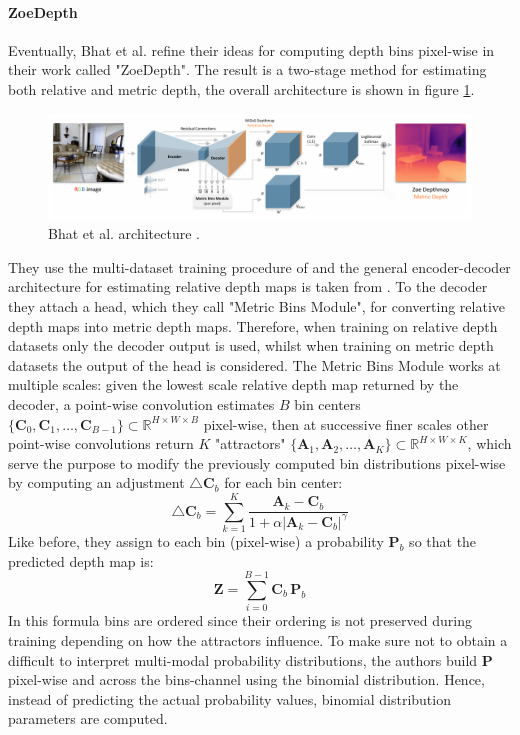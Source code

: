\paragraph{ZoeDepth} Eventually, Bhat et al. \cite{ZoeDepth} refine their ideas for computing depth bins pixel-wise in their work called "ZoeDepth".
The result is a two-stage method for estimating both relative and metric depth, the overall architecture is shown in figure \ref{fig:zoe_depth}.

\begin{figure}
	\centering
	\includegraphics[scale=0.3]{figs/zoe_depth}
	\caption{Bhat et al. architecture \cite{ZoeDepth}. \label{fig:zoe_depth}}
\end{figure}

They use the multi-dataset training procedure of \cite{MiDas} and the general encoder-decoder architecture for estimating relative depth maps is taken from \cite{denseViT}.
To the decoder they attach a head, which they call "Metric Bins Module", for converting relative depth maps into metric depth maps.
Therefore, when training on relative depth datasets only the decoder output is used, whilst when training on metric depth datasets the output of the head is considered.
The Metric Bins Module works at multiple scales: given the lowest scale relative depth map returned by the decoder, a point-wise convolution estimates $B$ bin centers $\{\mathbf{C}_{0}, \mathbf{C}_{1}, \dotsc, \mathbf{C}_{B-1}\} \subset \mathbb{R}^{H \times W \times B}$ pixel-wise, then at successive finer scales other point-wise convolutions return $K$ "attractors" $\{\mathbf{A}_{1}, \mathbf{A}_{2}, \dotsc, \mathbf{A}_{K}\} \subset \mathbb{R}^{H \times W \times K}$, which serve the purpose to modify the previously computed bin distributions pixel-wise by computing an adjustment $\triangle \mathbf{C}_{b}$ for each bin center:
\[
	\triangle \mathbf{C}_{b} = \sum_{k=1}^{K} \frac{\mathbf{A}_{k} - \mathbf{C}_{b}}{1 + \alpha | \mathbf{A}_{k} - \mathbf{C}_{b} |^{\gamma}}
\]
Like before, they assign to each bin (pixel-wise) a probability $\mathbf{P}_{b}$ so that the predicted depth map is:
\[
	\mathbf{Z} = \sum_{i=0}^{B-1} \mathbf{C}_{b} \, \mathbf{P}_{b}
\]
In this formula bins are ordered since their ordering is not preserved during training depending on how the attractors influence.
To make sure not to obtain a difficult to interpret multi-modal probability distributions, the authors build $\mathbf{P}$ pixel-wise and across the bins-channel using the binomial distribution.
Hence, instead of predicting the actual probability values, binomial distribution parameters are computed.
